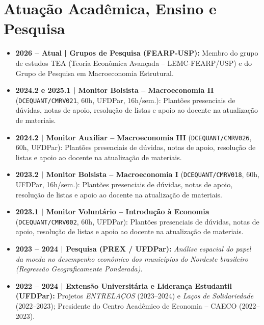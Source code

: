 \documentclass[10pt,a4paper]{article}
\begin{document}
\section{Atuação Acadêmica, Ensino e Pesquisa}
\begin{itemize}\small
  \item \textbf{2026 -- Atual | Grupos de Pesquisa (FEARP-USP):} Membro do grupo de estudos TEA (Teoria Econômica Avançada -- LEMC-FEARP/USP) e do Grupo de Pesquisa em Macroeconomia Estrutural.
  \item \textbf{2024.2 e 2025.1 | Monitor Bolsista -- Macroeconomia II} (\texttt{DCEQUANT/CMRV021}, 60h, UFDPar, 16h/sem.): Plantões presenciais de dúvidas, notas de apoio, resolução de listas e apoio ao docente na atualização de materiais.
  \item \textbf{2024.2 | Monitor Auxiliar -- Macroeconomia III} (\texttt{DCEQUANT/CMRV026}, 60h, UFDPar): Plantões presenciais de dúvidas, notas de apoio, resolução de listas e apoio ao docente na atualização de materiais.
  \item \textbf{2023.2 | Monitor Bolsista -- Macroeconomia I} (\texttt{DCEQUANT/CMRV018}, 60h, UFDPar, 16h/sem.): Plantões presenciais de dúvidas, notas de apoio, resolução de listas e apoio ao docente na atualização de materiais.
  \item \textbf{2023.1 | Monitor Voluntário -- Introdução à Economia} (\texttt{DCEQUANT/CMRV002}, 60h, UFDPar): Plantões presenciais de dúvidas, notas de apoio, resolução de listas e apoio ao docente na atualização de materiais.
  \item \textbf{2023 -- 2024 | Pesquisa (PREX / UFDPar):} \textit{Análise espacial do papel da moeda no desempenho econômico dos municípios do Nordeste brasileiro (Regressão Geograficamente Ponderada)}.
  \item \textbf{2022 -- 2024 | Extensão Universitária e Liderança Estudantil (UFDPar):} Projetos \textit{ENTRELAÇOS} (2023--2024) e \textit{Laços de Solidariedade} (2022--2023); Presidente do Centro Acadêmico de Economia -- CAECO (2022--2023).
\end{itemize}

\end{document}
